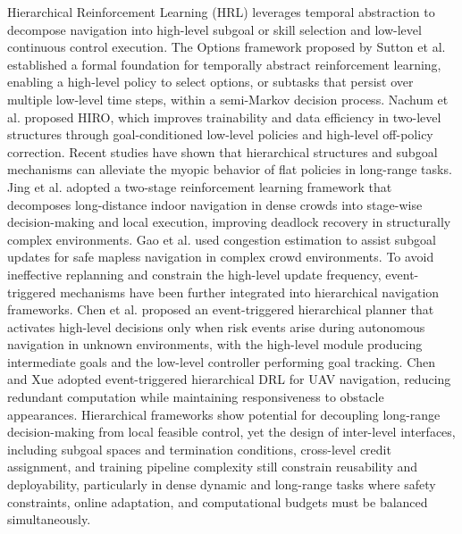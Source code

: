 Hierarchical Reinforcement Learning (HRL) leverages temporal abstraction to decompose navigation into high-level subgoal or skill selection and low-level continuous control execution. The Options framework proposed by Sutton et al. \cite{12} established a formal foundation for temporally abstract reinforcement learning, enabling a high-level policy to select options, or subtasks that persist over multiple low-level time steps, within a semi-Markov decision process. Nachum et al. \cite{28} proposed HIRO, which improves trainability and data efficiency in two-level structures through goal-conditioned low-level policies and high-level off-policy correction. Recent studies have shown that hierarchical structures and subgoal mechanisms can alleviate the myopic behavior of flat policies in long-range tasks. Jing et al. \cite{14} adopted a two-stage reinforcement learning framework that decomposes long-distance indoor navigation in dense crowds into stage-wise decision-making and local execution, improving deadlock recovery in structurally complex environments. Gao et al. \cite{13} used congestion estimation to assist subgoal updates for safe mapless navigation in complex crowd environments. To avoid ineffective replanning and constrain the high-level update frequency, event-triggered mechanisms have been further integrated into hierarchical navigation frameworks. Chen et al. \cite{16} proposed an event-triggered hierarchical planner that activates high-level decisions only when risk events arise during autonomous navigation in unknown environments, with the high-level module producing intermediate goals and the low-level controller performing goal tracking. Chen and Xue \cite{29} adopted event-triggered hierarchical DRL for UAV navigation, reducing redundant computation while maintaining responsiveness to obstacle appearances. Hierarchical frameworks show potential for decoupling long-range decision-making from local feasible control, yet the design of inter-level interfaces, including subgoal spaces and termination conditions, cross-level credit assignment, and training pipeline complexity still constrain reusability and deployability, particularly in dense dynamic and long-range tasks where safety constraints, online adaptation, and computational budgets must be balanced simultaneously.

